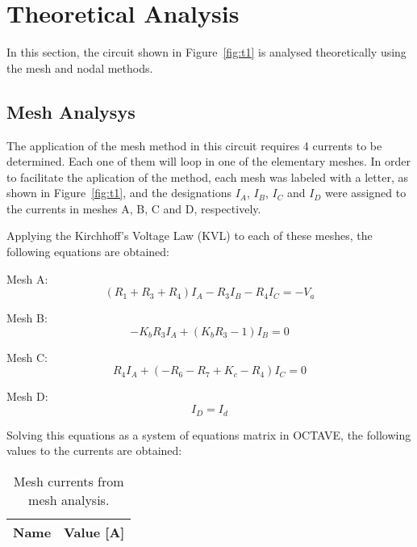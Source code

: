 \section{Theoretical Analysis}
\label{sec:analysis}

In this section, the circuit shown in Figure~\ref{fig:t1} is analysed
theoretically using the mesh and nodal methods.

\subsection{Mesh Analysys}

The application of the mesh method in this circuit requires 4 currents to be determined. Each one of them will loop in one of the elementary meshes.
In order to facilitate the aplication of the method, each mesh was labeled with a letter, as shown in Figure~\ref{fig:t1}, and the designations $I_A$, $I_B$, $I_C$ and $I_D$
were assigned to the currents in meshes A, B, C and D, respectively. 

Applying the Kirchhoff's Voltage Law (KVL) to each of these meshes, the following equations are obtained:\vspace{4mm}

Mesh A:
\begin{equation}
  (R_1+R_3+R_4)I_A - R_3I_B - R_4I_C = -V_a
  \label{eq:A}
\end{equation}

Mesh B:
\begin{equation}
  -K_bR_3I_A + (K_bR_3-1)I_B = 0
  \label{eq:B}
\end{equation}

Mesh C:
\begin{equation}
  R_4I_A + (-R_6-R_7+K_c-R_4)I_C = 0
  \label{eq:C}
\end{equation}

Mesh D:
\begin{equation}
  I_D = I_d
  \label{eq:D}
\end{equation}

Solving this equations as a system of equations matrix in OCTAVE, the following values to the currents are obtained:

\begin{table}[h]
  \centering
  \begin{tabular}{|l|r|}
    \hline    
    {\bf Name} & {\bf Value [A]} \\ \hline
    
  \end{tabular}
  \caption{Mesh currents from mesh analysis.}
  \label{tab:meshI}
\end{table}

